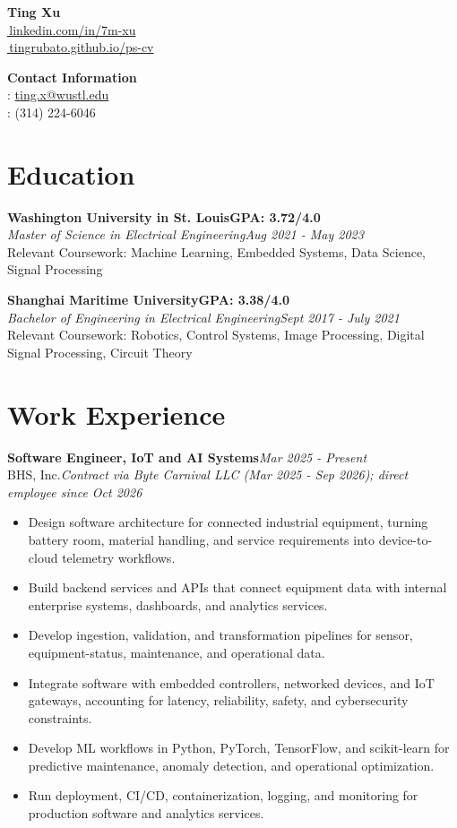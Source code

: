 \documentclass[letterpaper,10pt]{article}
\newcommand{\entry}[4]{%
  \textbf{#1}\hfill\textit{#2}\\
  #3\hfill #4\par}
\newcommand{\edu}[5]{%
  \textbf{#1}\hfill\textbf{GPA: #2}\\
  \textit{#3}\hfill\textit{#4}\\
  Relevant Coursework: #5\par}
\begin{document}
\begin{minipage}[t]{0.6\textwidth}
  {\Large\bfseries Ting Xu}\\
  \href{https://www.linkedin.com/in/7m-xu}{\faLinkedin\,linkedin.com/in/7m-xu}\\
  \href{https://tingrubato.github.io/ps-cv/}{\faGithub\,tingrubato.github.io/ps-cv}
\end{minipage}\hfill
\begin{minipage}[t]{0.38\textwidth}\raggedleft
  \textbf{Contact Information}\\
  \faEnvelope: \href{mailto:ting.x@wustl.edu}{ting.x@wustl.edu}\\
  \faPhone: (314) 224-6046
\end{minipage}

\section{Education}

\edu{Washington University in St. Louis}{3.72/4.0}
  {Master of Science in Electrical Engineering}{Aug 2021 - May 2023}
  {Machine Learning, Embedded Systems, Data Science, Signal Processing}

\edu{Shanghai Maritime University}{3.38/4.0}
  {Bachelor of Engineering in Electrical Engineering}{Sept 2017 - July 2021}
  {Robotics, Control Systems, Image Processing, Digital Signal Processing, Circuit Theory}

\section{Work Experience}

\entry{Software Engineer, IoT and AI Systems}{Mar 2025 - Present}
  {BHS, Inc.}{\textit{Contract via Byte Carnival LLC (Mar 2025 - Sep 2026); direct employee since Oct 2026}}
\begin{itemize}
  \item Design software architecture for connected industrial equipment, turning battery room, material handling, and service requirements into device-to-cloud telemetry workflows.
  \item Build backend services and APIs that connect equipment data with internal enterprise systems, dashboards, and analytics services.
  \item Develop ingestion, validation, and transformation pipelines for sensor, equipment-status, maintenance, and operational data.
  \item Integrate software with embedded controllers, networked devices, and IoT gateways, accounting for latency, reliability, safety, and cybersecurity constraints.
  \item Develop ML workflows in Python, PyTorch, TensorFlow, and scikit-learn for predictive maintenance, anomaly detection, and operational optimization.
  \item Run deployment, CI/CD, containerization, logging, and monitoring for production software and analytics services.
\end{itemize}
\end{document}
